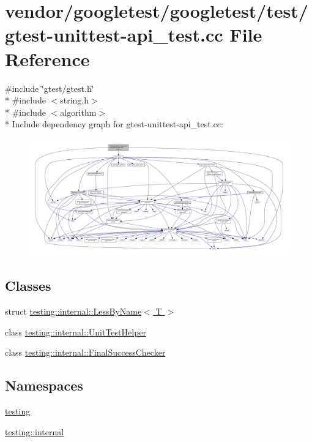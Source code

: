 \hypertarget{gtest-unittest-api__test_8cc}{}\section{vendor/googletest/googletest/test/gtest-\/unittest-\/api\+\_\+test.cc File Reference}
\label{gtest-unittest-api__test_8cc}
{\ttfamily \#include \char`\"{}gtest/gtest.\+h\char`\"{}}\\*
{\ttfamily \#include $<$string.\+h$>$}\\*
{\ttfamily \#include $<$algorithm$>$}\\*
Include dependency graph for gtest-\/unittest-\/api\+\_\+test.cc\+:
\nopagebreak
\begin{figure}[H]
\begin{center}
\leavevmode
\includegraphics[width=350pt]{gtest-unittest-api__test_8cc__incl}
\end{center}
\end{figure}
\subsection*{Classes}
\begin{DoxyCompactItemize}
\item 
struct \hyperlink{structtesting_1_1internal_1_1LessByName}{testing\+::internal\+::\+Less\+By\+Name$<$ T $>$}
\item 
class \hyperlink{classtesting_1_1internal_1_1UnitTestHelper}{testing\+::internal\+::\+Unit\+Test\+Helper}
\item 
class \hyperlink{classtesting_1_1internal_1_1FinalSuccessChecker}{testing\+::internal\+::\+Final\+Success\+Checker}
\end{DoxyCompactItemize}
\subsection*{Namespaces}
\begin{DoxyCompactItemize}
\item 
 \hyperlink{namespacetesting}{testing}
\item 
 \hyperlink{namespacetesting_1_1internal}{testing\+::internal}
\end{DoxyCompactItemize}
